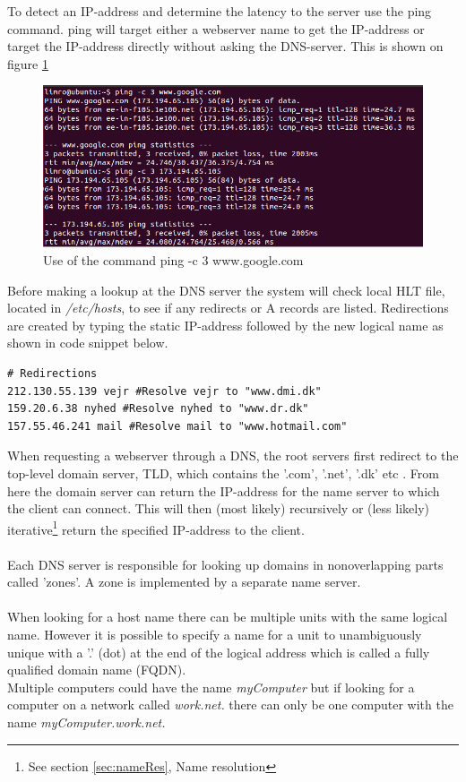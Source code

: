 \documentclass[a4paper,10pt]{report}
\newcommand{\code}[1]{{\fontfamily{pcr}\selectfont #1}}
\begin{document}
To detect an IP-address and determine the latency to the server use the \code{ping} command.
\code{ping} will target either a webserver name to get the IP-address or target the IP-address directly without asking the DNS-server.
This is shown on figure \ref{fig:ping}


\begin{figure}[H]
\centering
\includegraphics[scale=0.7]{ping}
\caption{Use of the command \code{ping -c 3 www.google.com}}
\label{fig:ping}
\end{figure}


Before making a lookup at the DNS server the system will check local HLT file, located in  \textit{/etc/hosts}, to see if any redirects or A records are listed.
Redirections are created by typing the static IP-address followed by the new logical name as shown in code snippet below.


\begin{lstlisting}[caption={Hosts file redirection}, style=Code-Bash, label=lst:redirect]
# Redirections
212.130.55.139 vejr #Resolve vejr to "www.dmi.dk"
159.20.6.38 nyhed #Resolve nyhed to "www.dr.dk"
157.55.46.241 mail #Resolve mail to "www.hotmail.com"
\end{lstlisting}

\vspace{10px}

When requesting a webserver through a DNS, the root servers first redirect to the top-level domain server, TLD, which contains the '.com', '.net', '.dk' etc \cite[p. 192]{Tanenbaum}.
From here the domain server can return the IP-address for the name server to which the client can connect. 
This will then (most likely) recursively or (less likely) iterative\footnote{See section \ref{sec:nameRes}, Name resolution} return the specified IP-address to the client.
\\
\\
Each DNS server is responsible for looking up domains in nonoverlapping parts called 'zones'. 
A zone is implemented by a separate name server\cite[p. 202-205]{Tanenbaum}.
\\
\\
When looking for a host name there can be multiple units with the same logical name. 
However it is possible to specify a name for a unit to unambiguously unique with a '.' (dot) at the end of the logical address which is called a fully qualified domain name (FQDN)\cite{wiki-fqdn}.
\\
Multiple computers could have the name \textit{myComputer} but if looking for a computer on a network called \textit{work.net.} there can only be one computer with the name \textit{myComputer.work.net.}
\end{document}
